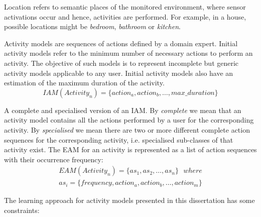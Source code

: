 \begin{defn}[Location]
 Location refers to semantic places of the monitored environment, where sensor activations occur and hence, activities are performed. For example, in a house, possible locations might be \textit{bedroom}, \textit{bathroom} or \textit{kitchen}. 
\end{defn}

\begin{defn}
Activity models are sequences of actions defined by a domain expert. Initial activity models refer to the minimum number of necessary actions to perform an activity. The objective of such models is to represent incomplete but generic activity models applicable to any user. Initial activity models also have an estimation of the maximum duration of the activity.
\begin{equation}
  IAM(Activity_n) = \{action_a, action_b, \ldots , max\_duration\}
 \end{equation} 
\end{defn}

\begin{defn}
 A complete and specialised version of an IAM. By \textit{complete} we mean that an activity model contains all the actions performed by a user for the corresponding activity. By \textit{specialised} we mean there are two or more different complete action sequences for the corresponding activity, i.e. specialised sub-classes of that activity exist. The EAM for an activity is represented as a list of action sequences with their occurrence frequency:
\begin{equation}
 \begin{split}
 EAM(Activity_n) = \{as_1, as_2, \ldots , as_n\} \ \ \ where \\
 as_i = \{frequency, action_a, action_b, \ldots, action_m\}
 \end{split}
 \label{eq-eam}
\end{equation}
\end{defn}

The learning approach for activity models presented in this dissertation has some constraints:

